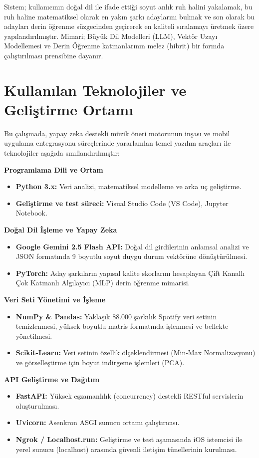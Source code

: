 \documentclass[12pt, a4paper]{report}
\begin{document}
Sistem; kullanıcının doğal dil ile ifade ettiği soyut anlık ruh halini yakalamak, bu ruh haline matematiksel olarak en yakın şarkı adaylarını bulmak ve son olarak bu adayları derin öğrenme süzgecinden geçirerek en kaliteli sıralamayı üretmek üzere yapılandırılmıştır. Mimari; Büyük Dil Modelleri (LLM), Vektör Uzayı Modellemesi ve Derin Öğrenme katmanlarının melez (hibrit) bir formda çalıştırılması prensibine dayanır.

\section{Kullanılan Teknolojiler ve Geliştirme Ortamı}

Bu çalışmada, yapay zeka destekli müzik öneri motorunun inşası ve mobil uygulama entegrasyonu süreçlerinde yararlanılan temel yazılım araçları ile teknolojiler aşağıda sınıflandırılmıştır:

\textbf{Programlama Dili ve Ortam}
\begin{itemize}
    \item \textbf{Python 3.x:} Veri analizi, matematiksel modelleme ve arka uç geliştirme.
    \item \textbf{Geliştirme ve test süreci:} Visual Studio Code (VS Code), Jupyter Notebook.
\end{itemize}

\textbf{Doğal Dil İşleme ve Yapay Zeka}
\begin{itemize}
    \item \textbf{Google Gemini 2.5 Flash API:} Doğal dil girdilerinin anlamsal analizi ve JSON formatında 9 boyutlu soyut duygu durum vektörüne dönüştürülmesi.
    \item \textbf{PyTorch:} Aday şarkıların yapısal kalite skorlarını hesaplayan Çift Kanallı Çok Katmanlı Algılayıcı (MLP) derin öğrenme mimarisi.
\end{itemize}

\textbf{Veri Seti Yönetimi ve İşleme}
\begin{itemize}
    \item \textbf{NumPy \& Pandas:} Yaklaşık 88.000 şarkılık Spotify veri setinin temizlenmesi, yüksek boyutlu matris formatında işlenmesi ve bellekte yönetilmesi.
    \item \textbf{Scikit-Learn:} Veri setinin özellik ölçeklendirmesi (Min-Max Normalizasyonu) ve görselleştirme için boyut indirgeme işlemleri (PCA).
\end{itemize}

\textbf{API Geliştirme ve Dağıtım}
\begin{itemize}
    \item \textbf{FastAPI:} Yüksek eşzamanlılık (concurrency) destekli RESTful servislerin oluşturulması.
    \item \textbf{Uvicorn:} Asenkron ASGI sunucu ortamı çalıştırıcısı.
    \item \textbf{Ngrok / Localhost.run:} Geliştirme ve test aşamasında iOS istemcisi ile yerel sunucu (localhost) arasında güvenli iletişim tünellerinin kurulması.
\end{itemize}
\end{document}

